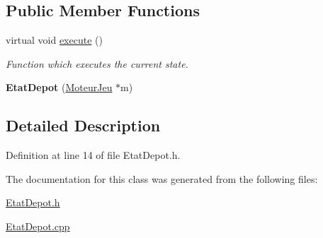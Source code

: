 \subsection*{Public Member Functions}
\begin{DoxyCompactItemize}
\item 
\hypertarget{class_etat_depot_a590535cf485b98a301338e4e393f53c7}{
virtual void \hyperlink{class_etat_depot_a590535cf485b98a301338e4e393f53c7}{execute} ()}
\label{class_etat_depot_a590535cf485b98a301338e4e393f53c7}

\begin{DoxyCompactList}\small\item\em Function which executes the current state. \item\end{DoxyCompactList}\item 
\hypertarget{class_etat_depot_ad62955e16e1aaad8e067086a87cd5e1a}{
{\bfseries EtatDepot} (\hyperlink{class_moteur_jeu}{MoteurJeu} $\ast$m)}
\label{class_etat_depot_ad62955e16e1aaad8e067086a87cd5e1a}

\end{DoxyCompactItemize}


\subsection{Detailed Description}


Definition at line 14 of file EtatDepot.h.



The documentation for this class was generated from the following files:\begin{DoxyCompactItemize}
\item 
\hyperlink{_etat_depot_8h}{EtatDepot.h}\item 
\hyperlink{_etat_depot_8cpp}{EtatDepot.cpp}\end{DoxyCompactItemize}
